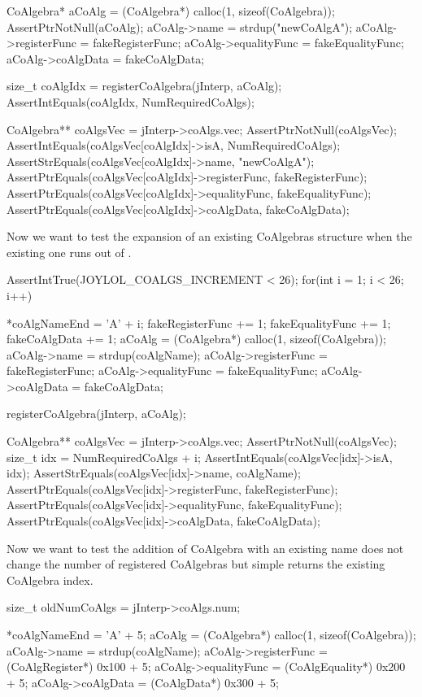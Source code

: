   CoAlgebra* aCoAlg    = (CoAlgebra*) calloc(1, sizeof(CoAlgebra));
  AssertPtrNotNull(aCoAlg);
  aCoAlg->name         = strdup("newCoAlgA");
  aCoAlg->registerFunc = fakeRegisterFunc;
  aCoAlg->equalityFunc = fakeEqualityFunc;
  aCoAlg->coAlgData    = fakeCoAlgData;
  
  size_t coAlgIdx = registerCoAlgebra(jInterp, aCoAlg);
  AssertIntEquals(coAlgIdx, NumRequiredCoAlgs);
  
  CoAlgebra** coAlgsVec = jInterp->coAlgs.vec;
  AssertPtrNotNull(coAlgsVec);
  AssertIntEquals(coAlgsVec[coAlgIdx]->isA, NumRequiredCoAlgs);
  AssertStrEquals(coAlgsVec[coAlgIdx]->name, "newCoAlgA");
  AssertPtrEquals(coAlgsVec[coAlgIdx]->registerFunc, fakeRegisterFunc);
  AssertPtrEquals(coAlgsVec[coAlgIdx]->equalityFunc, fakeEqualityFunc);
  AssertPtrEquals(coAlgsVec[coAlgIdx]->coAlgData,    fakeCoAlgData);
\stopCTest

Now we want to test the expansion of an existing CoAlgebras structure when 
the existing one runs out of . 

\startCTest
  AssertIntTrue(JOYLOL_COALGS_INCREMENT < 26);
  for(int i = 1; i < 26; i++) {
    *coAlgNameEnd        = 'A' + i;
    fakeRegisterFunc    += 1;
    fakeEqualityFunc    += 1;
    fakeCoAlgData       += 1;
    aCoAlg               = (CoAlgebra*) calloc(1, sizeof(CoAlgebra));
    aCoAlg->name         = strdup(coAlgName);
    aCoAlg->registerFunc = fakeRegisterFunc;
    aCoAlg->equalityFunc = fakeEqualityFunc;
    aCoAlg->coAlgData    = fakeCoAlgData;
    
    registerCoAlgebra(jInterp, aCoAlg);

    CoAlgebra** coAlgsVec = jInterp->coAlgs.vec;
    AssertPtrNotNull(coAlgsVec);
    size_t idx = NumRequiredCoAlgs + i;
    AssertIntEquals(coAlgsVec[idx]->isA, idx);
    AssertStrEquals(coAlgsVec[idx]->name, coAlgName);
    AssertPtrEquals(coAlgsVec[idx]->registerFunc, fakeRegisterFunc);
    AssertPtrEquals(coAlgsVec[idx]->equalityFunc, fakeEqualityFunc);
    AssertPtrEquals(coAlgsVec[idx]->coAlgData,    fakeCoAlgData);
  }
\stopCTest

Now we want to test the addition of CoAlgebra with an existing name does 
not change the number of registered CoAlgebras but simple returns the 
existing CoAlgebra index. 

\startCTest
  size_t oldNumCoAlgs  = jInterp->coAlgs.num;

  *coAlgNameEnd        = 'A' + 5;
  aCoAlg               = (CoAlgebra*) calloc(1, sizeof(CoAlgebra));
  aCoAlg->name         = strdup(coAlgName);
  aCoAlg->registerFunc = (CoAlgRegister*) 0x100 + 5;
  aCoAlg->equalityFunc = (CoAlgEquality*) 0x200 + 5;
  aCoAlg->coAlgData    = (CoAlgData*)     0x300 + 5;
  
